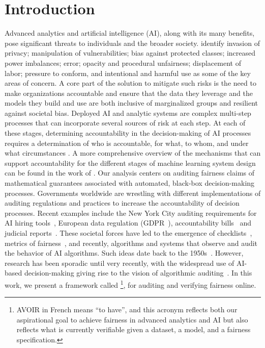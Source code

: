 \section{Introduction}

Advanced analytics and artificial intelligence (AI), along with its many benefits, pose significant threats to individuals and the broader society.
\citet{Hirsch20} identify invasion of privacy; manipulation of vulnerabilities;  bias against protected classes; increased power imbalances;  error; opacity and procedural unfairness; displacement of labor;  pressure to conform, and intentional and harmful use as some of the key areas of concern.
A core part of the solution to mitigate such risks is the need to make organizations accountable and ensure that the data they leverage and the models they build and use are both inclusive of marginalized groups and resilient against societal bias.
Deployed AI and analytic systems are complex multi-step processes that can incorporate several sources of risk at each step.
At each of these stages, determining accountability in the decision-making of AI processes requires a determination of who is accountable, for what, to whom, and under what circumstances \citep{nissenbaum1996accountability,cooper2022accountability}. 
A more comprehensive overview of the mechanisms that can support accountability for the different stages of machine learning system design can be found in the work of \citet{cooper2022accountability}.
Our analysis centers on auditing fairness claims of mathematical guarantees associated with automated, black-box decision-making processes.
Governments worldwide are wrestling with different implementations of auditing regulations and practices to increase the accountability of decision processes.
Recent examples include the New York City auditing requirements for AI hiring tools~\citep{vanderford2022nybiaslaw}, European data regulation (GDPR~\citep{GDPR}), accountability bills~\citep{congress2023hr,algtransparency2022} and judicial reports~\citep{justice2018free}.
These societal forces have led to the emergence of checklists~\citep{mitchell2019model,sokol2020explainability}, metrics of fairness~\citep{verma2018fairness}, and recently, algorithms and systems that observe and audit the behavior of AI algorithms.
Such ideas date back to the 1950s~\citep{Moore1956}.
However, research has been sporadic until very recently, with the widespread use of AI-based decision-making giving rise to the vision of algorithmic auditing~\citep{Clavell20}.
In this work, we present a framework called \AVOIRmethodname{}\footnote{AVOIR in French means ``to have'', and this acronym reflects both our aspirational goal to achieve fairness in advanced analytics and AI but also reflects what is currently verifiable given a dataset, a model, and a fairness specification.}, for auditing and verifying fairness online.
